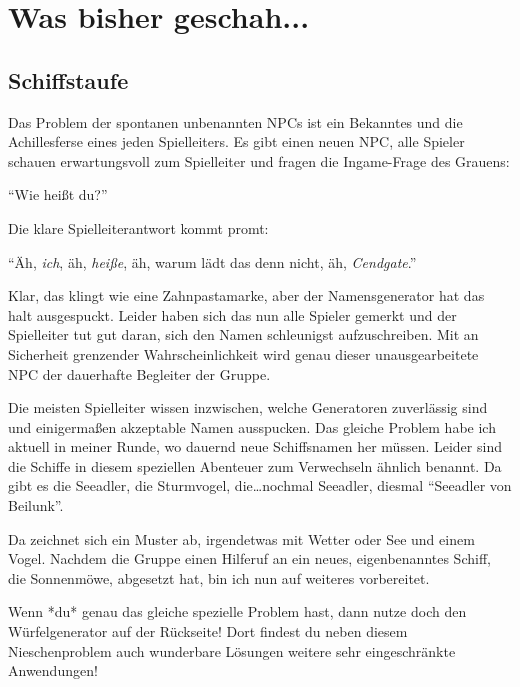 \documentclass[final]{multiversum}
\begin{document}
\makemultititle
%

\section{Was bisher geschah...}

\subsection{Schiffstaufe}
Das Problem der spontanen unbenannten NPCs ist ein Bekanntes und die Achillesferse eines jeden Spielleiters.
Es gibt einen neuen NPC, alle Spieler schauen erwartungsvoll zum Spielleiter und fragen die Ingame-Frage des Grauens:

\enquote{Wie heißt du?}

Die klare Spielleiterantwort kommt promt:

\enquote{Äh, \textit{ich}, äh, \textit{heiße}, äh, warum lädt das denn nicht, äh, \textit{Cendgate}.}

Klar, das klingt wie eine Zahnpastamarke, aber der Namensgenerator hat das halt ausgespuckt.
Leider haben sich das nun alle Spieler gemerkt und der Spielleiter tut gut daran, sich den Namen schleunigst aufzuschreiben.
Mit an Sicherheit grenzender Wahrscheinlichkeit wird genau dieser unausgearbeitete NPC der dauerhafte Begleiter der Gruppe.

Die meisten Spielleiter wissen inzwischen, welche Generatoren zuverlässig sind und einigermaßen akzeptable Namen ausspucken.
Das gleiche Problem habe ich aktuell in meiner Runde, wo dauernd neue Schiffsnamen her müssen.
Leider sind die Schiffe in diesem speziellen Abenteuer zum Verwechseln ähnlich benannt.
Da gibt es die Seeadler, die Sturmvogel, die\dots nochmal Seeadler, diesmal \enquote{Seeadler von Beilunk}.

Da zeichnet sich ein Muster ab, irgendetwas mit Wetter oder See und einem Vogel.
Nachdem die Gruppe einen Hilferuf an ein neues, eigenbenanntes Schiff, die Sonnenmöwe, abgesetzt hat, bin ich nun auf weiteres vorbereitet.

Wenn *du* genau das gleiche spezielle Problem hast, dann nutze doch den Würfelgenerator auf der Rückseite!
Dort findest du neben diesem Nieschenproblem auch wunderbare Lösungen weitere sehr eingeschränkte Anwendungen!
\end{document}
